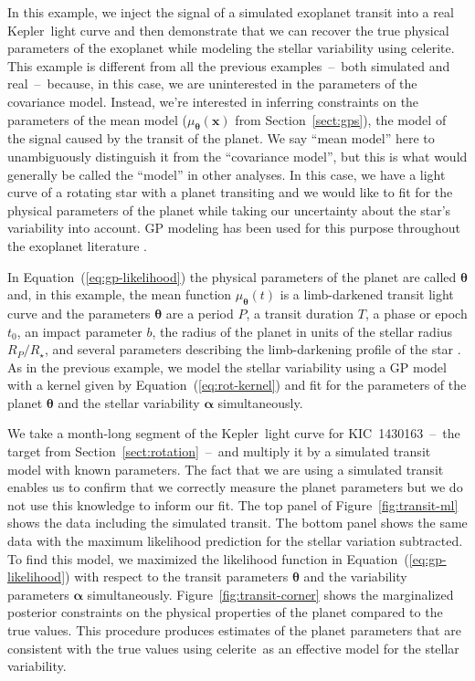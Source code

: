 \documentclass[manuscript, letterpaper]{aastex6}
\newcommand{\project}[1]{\textsf{#1}}
\newcommand{\kepler}{\project{Kepler}}
\newcommand{\celerite}{\project{celerite}}
\newcommand{\figureref}[1]{\ref{fig:#1}}
\newcommand{\Figure}[1]{Figure~\figureref{#1}}
\renewcommand{\eqref}[1]{\ref{eq:#1}}
\newcommand{\Eq}[1]{Equation~(\eqref{#1})}
\newcommand{\eq}[1]{\Eq{#1}}
\newcommand{\sectionname}{Section}
\newcommand{\sectref}[1]{\ref{sect:#1}}
\newcommand{\Sect}[1]{\sectionname~\sectref{#1}}
\newcommand{\sect}[1]{\Sect{#1}}
\newcommand{\bvec}[1]{{\ensuremath{\boldsymbol{#1}}}}
\begin{document}
In this example, we inject the signal of a simulated exoplanet transit into a
real \kepler\ light curve and then demonstrate that we can recover the true
physical parameters of the exoplanet while modeling the stellar variability
using \celerite.
This example is different from all the previous examples~--~both simulated and
real~--~because, in this case, we are uninterested in the parameters of the
covariance model.
Instead, we're interested in inferring constraints on the parameters of the
mean model ($\mu_\bvec{\theta}(\bvec{x})$ from \sect{gps}), the model of the
signal caused by the transit of the planet.
We say ``mean model'' here to unambiguously distinguish it from the
``covariance model'', but this is what would generally be called the ``model''
in other analyses.
In this case, we have a light curve of a rotating star with a planet
transiting and we would like to fit for the physical parameters of the planet
while taking our uncertainty about the star's variability into account.
GP modeling has been used for this purpose throughout the exoplanet literature
\citep[for example][]{Dawson:2014, Barclay:2015, Evans:2015,
Foreman-Mackey:2016b, Grunblatt:2016}.

In \eq{gp-likelihood} the physical parameters of the planet are called
$\bvec{\theta}$ and, in this example, the mean function $\mu_\bvec{\theta}(t)$
is a limb-darkened transit light curve \citep{Mandel:2002} and the parameters
$\bvec{\theta}$ are a period $P$, a transit duration $T$, a phase or epoch
$t_0$, an impact parameter $b$, the radius of the planet in units of the
stellar radius $R_P/R_\star$, and several parameters describing the
limb-darkening profile of the star \citep{Claret:2011}.
As in the previous example, we model the stellar variability using a GP model
with a kernel given by \eq{rot-kernel} and fit for the parameters of the
planet $\bvec{\theta}$ and the stellar variability $\bvec{\alpha}$
simultaneously.

We take a month-long segment of the \kepler\ light curve for
KIC~1430163~--~the target from \sect{rotation}~--~and multiply it by a
simulated transit model with known parameters.
The fact that we are using a simulated transit enables us to confirm that we
correctly measure the planet parameters but we do not use this knowledge to
inform our fit.
The top panel of \Figure{transit-ml} shows the data including the simulated
transit.
The bottom panel shows the same data with the maximum likelihood prediction
for the stellar variation subtracted.
To find this model, we maximized the likelihood function in \eq{gp-likelihood}
with respect to the transit parameters $\bvec{\theta}$ and the variability
parameters $\bvec{\alpha}$ simultaneously.
\Figure{transit-corner} shows the marginalized posterior constraints on the
physical properties of the planet compared to the true values.
This procedure produces estimates of the planet parameters that are consistent
with the true values using \celerite\ as an effective model for the stellar
variability.
\end{document}
